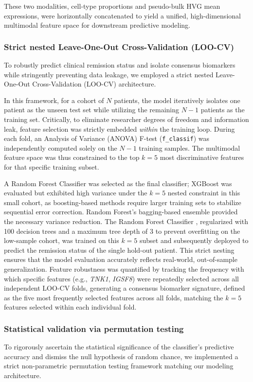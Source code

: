 \documentclass{bmcart}
\begin{document}
These two modalities, cell-type proportions and pseudo-bulk HVG mean expressions, were horizontally concatenated to yield a unified, high-dimensional multimodal feature space for downstream predictive modeling.

\subsubsection*{Strict nested Leave-One-Out Cross-Validation (LOO-CV)}
To robustly predict clinical remission status and isolate consensus biomarkers while stringently preventing data leakage, we employed a strict nested Leave-One-Out Cross-Validation (LOO-CV) architecture.

In this framework, for a cohort of $N$ patients, the model iteratively isolates one patient as the unseen test set while utilizing the remaining $N-1$ patients as the training set. Critically, to eliminate researcher degrees of freedom and information leak, feature selection was strictly embedded \textit{within} the training loop. During each fold, an Analysis of Variance (ANOVA) F-test (\texttt{f\_classif}) was independently computed solely on the $N-1$ training samples. The multimodal feature space was thus constrained to the top $k=5$ most discriminative features for that specific training subset.

A Random Forest Classifier \cite{breiman} was selected as the final classifier; XGBoost was evaluated but exhibited high variance under the $k=5$ nested constraint in this small cohort, as boosting-based methods require larger training sets to stabilize sequential error correction. Random Forest's bagging-based ensemble provided the necessary variance reduction. The Random Forest Classifier \cite{breiman}, regularized with 100 decision trees and a maximum tree depth of 3 to prevent overfitting on the low-sample cohort, was trained on this $k=5$ subset and subsequently deployed to predict the remission status of the single hold-out patient. This strict nesting ensures that the model evaluation accurately reflects real-world, out-of-sample generalization. Feature robustness was quantified by tracking the frequency with which specific features (e.g., \textit{TNK1}, \textit{IGSF8}) were repeatedly selected across all independent LOO-CV folds, generating a consensus biomarker signature, defined as the five most frequently selected features across all folds, matching the $k=5$ features selected within each individual fold.

\subsubsection*{Statistical validation via permutation testing}
To rigorously ascertain the statistical significance of the classifier's predictive accuracy and dismiss the null hypothesis of random chance, we implemented a strict non-parametric permutation testing framework matching our modeling architecture.
\end{document}
